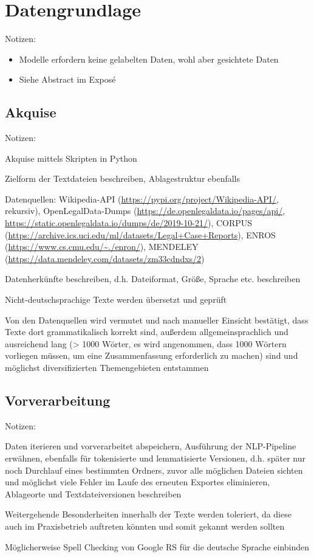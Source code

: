 \chapter{Datengrundlage}
\thispagestyle{fancy}
\label{chap:Datengrundlage}

Notizen:
\begin{itemize}
	\item Modelle erfordern keine gelabelten Daten, wohl aber gesichtete Daten	
	\item Siehe Abstract im Exposé
\end{itemize}


\section{Akquise}
Notizen:
	\item Akquise mittels Skripten in Python
	\item Zielform der Textdateien beschreiben, Ablagestruktur ebenfalls
	\item Datenquellen: Wikipedia-API (\url{https://pypi.org/project/Wikipedia-API/}, rekursiv), OpenLegalData-Dumps (\url{https://de.openlegaldata.io/pages/api/}, \url{https://static.openlegaldata.io/dumps/de/2019-10-21/}), CORPUS (\url{https://archive.ics.uci.edu/ml/datasets/Legal+Case+Reports}), ENROS (\url{https://www.cs.cmu.edu/~./enron/}), MENDELEY (\url{https://data.mendeley.com/datasets/zm33cdndxs/2})
	\item Datenherkünfte beschreiben, d.h. Dateiformat, Größe, Sprache etc. beschreiben
	\item Nicht-deutschsprachige Texte werden übersetzt und geprüft
	\item Von den Datenquellen wird vermutet und nach manueller Einsicht bestätigt, dass Texte dort grammatikalisch korrekt sind, außerdem allgemeinsprachlich und ausreichend lang (> 1000 Wörter, es wird angenommen, dass 1000 Wörtern vorliegen müssen, um eine Zusammenfassung erforderlich zu machen) sind und möglichst diversifizierten Themengebieten entstammen


\section{Vorverarbeitung}
Notizen:
	\item Daten iterieren und vorverarbeitet abspeichern, Ausführung der NLP-Pipeline erwähnen, ebenfalls für tokenisierte und lemmatisierte Versionen, d.h. später nur noch Durchlauf eines bestimmten Ordners, zuvor alle möglichen Dateien sichten und möglichst viele Fehler im Laufe des erneuten Exportes eliminieren, Ablageorte und Textdateiversionen beschreiben
	\item Weitergehende Besonderheiten innerhalb der Texte werden toleriert, da diese auch im Praxisbetrieb auftreten könnten und somit gekannt werden sollten
	\item Möglicherweise Spell Checking von Google RS für die deutsche Sprache einbinden



